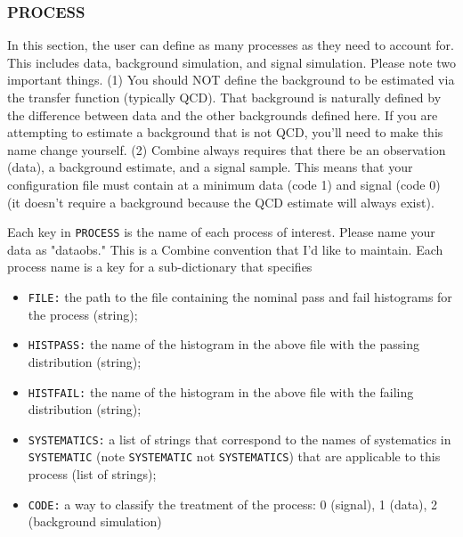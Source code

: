 \documentclass[letter]{article}
\begin{document}
        \subsubsection{PROCESS}
            In this section, the user can define as many processes as they need to account for. This includes data, background simulation, and signal simulation. Please note two important things. (1) You should NOT define the background to be estimated via the transfer function (typically QCD). That background is naturally defined by the difference between data and the other backgrounds defined here. If you are attempting to estimate a background that is not QCD, you'll need to make this name change yourself. (2) Combine always requires that there be an observation (data), a background estimate, and a signal sample. This means that your configuration file must contain at a minimum data (code 1) and signal (code 0) (it doesn't require a background because the QCD estimate will always exist). 

            Each key in \verb"PROCESS" is the name of each process of interest. Please name your data as "data\textunderscore obs." This is a Combine convention that I'd like to maintain. Each process name is a key for a sub-dictionary that specifies
            \begin{itemize}
                \item \verb"FILE:" the path to the file containing the nominal pass and fail histograms for the process (string);
                \item \verb"HISTPASS:" the name of the histogram in the above file with the passing distribution (string);
                \item \verb"HISTFAIL:" the name of the histogram in the above file with the failing distribution (string);
                \item \verb"SYSTEMATICS:" a list of strings that correspond to the names of systematics in \verb"SYSTEMATIC" (note \verb"SYSTEMATIC" not \verb"SYSTEMATICS") that are applicable to this process (list of strings);
                \item \verb"CODE:" a way to classify the treatment of the process: 0 (signal), 1 (data), 2 (background simulation)
            \end{itemize} 
\end{document}
